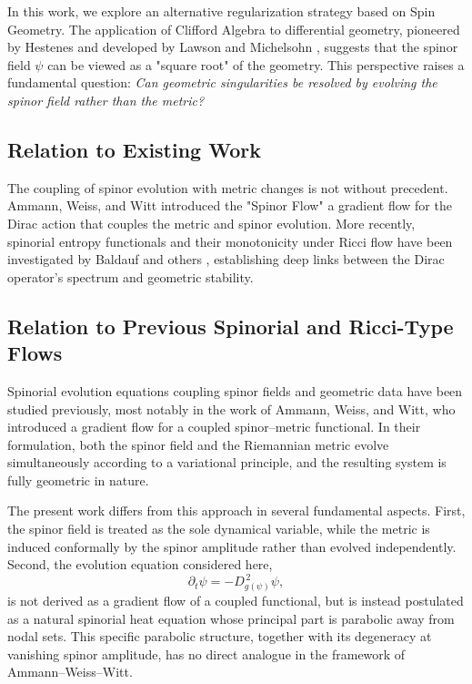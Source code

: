 \documentclass[11pt, reqno, a4paper]{amsart}
\theoremstyle{definition}
\theoremstyle{remark}
\begin{document}
In this work, we explore an alternative regularization strategy based on Spin Geometry. The application of Clifford Algebra to differential geometry, pioneered by Hestenes \cite{hestenes1966} and developed by Lawson and Michelsohn \cite{lawson1989}, suggests that the spinor field $\psi$ can be viewed as a "square root" of the geometry. This perspective raises a fundamental question: \textit{Can geometric singularities be resolved by evolving the spinor field rather than the metric?}

\subsection{Relation to Existing Work}
The coupling of spinor evolution with metric changes is not without precedent. Ammann, Weiss, and Witt \cite{ammann2012} introduced the "Spinor Flow" a gradient flow for the Dirac action that couples the metric and spinor evolution. More recently, spinorial entropy functionals and their monotonicity under Ricci flow have been investigated by Baldauf \cite{baldauf2022} and others \cite{2206.09198}, establishing deep links between the Dirac operator's spectrum and geometric stability.

\subsection{Relation to Previous Spinorial and Ricci-Type Flows}

Spinorial evolution equations coupling spinor fields and geometric data have
been studied previously, most notably in the work of Ammann, Weiss, and Witt,
who introduced a gradient flow for a coupled spinor--metric functional.
In their formulation, both the spinor field and the Riemannian metric evolve
simultaneously according to a variational principle, and the resulting system
is fully geometric in nature.

The present work differs from this approach in several fundamental aspects.
First, the spinor field is treated as the sole dynamical variable, while the
metric is induced conformally by the spinor amplitude rather than evolved
independently.
Second, the evolution equation considered here,
\[
\partial_t \psi = - D_{g(\psi)}^{\,2} \psi,
\]
is not derived as a gradient flow of a coupled functional, but is instead
postulated as a natural spinorial heat equation whose principal part is
parabolic away from nodal sets.
This specific parabolic structure, together with its degeneracy at vanishing
spinor amplitude, has no direct analogue in the framework of Ammann--Weiss--Witt.
\end{document}
